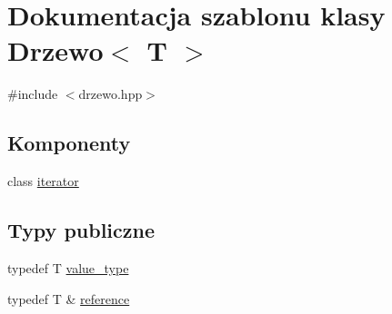 \hypertarget{class_drzewo}{}\section{Dokumentacja szablonu klasy Drzewo$<$ T $>$}
\label{class_drzewo}


{\ttfamily \#include $<$drzewo.\+hpp$>$}

\subsection*{Komponenty}
\begin{DoxyCompactItemize}
\item 
class \hyperlink{class_drzewo_1_1iterator}{iterator}
\end{DoxyCompactItemize}
\subsection*{Typy publiczne}
\begin{DoxyCompactItemize}
\item 
typedef T \hyperlink{class_drzewo_a349719391d8470c24d68e8a4f0fecf3c}{value\+\_\+type}
\item 
typedef T \& \hyperlink{class_drzewo_ad9689c01b3f07d1601e199799fcc1705}{reference}
\end{DoxyCompactItemize}
